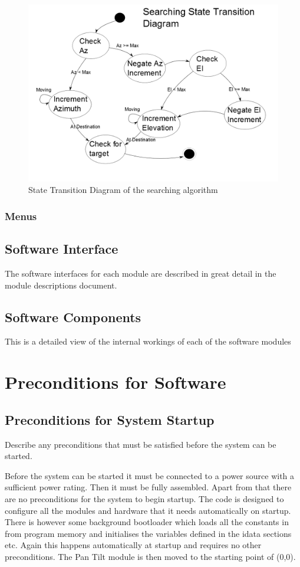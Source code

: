 \documentclass[]{report}
\begin{document}
\begin{figure}
\centering
\includegraphics[width=0.7\linewidth]{"../Diagrams/Searching State Transition Diagram"}
\caption{State Transition Diagram of the searching algorithm}
\label{fig:SearchingStateTransitionDiagram}
\end{figure}


\subsubsection{Menus}

\subsection{Software Interface}
The software interfaces for each module are described in great detail in the module descriptions document.

\subsection{Software Components}
This is a detailed view of the internal workings of each of the software modules

\section{Preconditions for Software}
\subsection{Preconditions for System Startup}
Describe any preconditions that must be satisfied before the system can be started.

Before the system can be started it must be connected to a power source with a sufficient power rating. Then it must be fully assembled. Apart from that there are no preconditions for the system to begin startup. The code is designed to configure all the modules and hardware that it needs automatically on startup. There is however some background bootloader which loads all the constants in from program memory and initialises the variables defined in the idata sections etc. Again this happens automatically at startup and requires no other preconditions. The Pan Tilt module is then moved to the starting point of (0,0).
\end{document}
